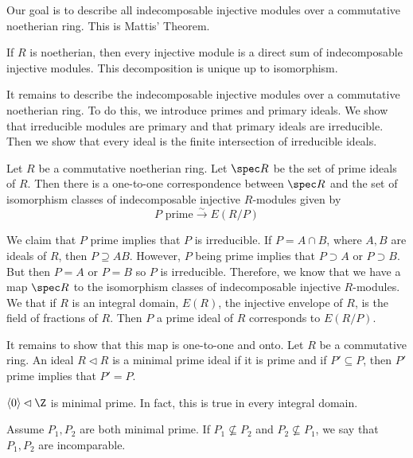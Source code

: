 Our goal is to describe all indecomposable injective modules over a commutative noetherian ring. This is Mattis' Theorem.

\begin{thm}
If $R$ is noetherian, then every injective module is a direct sum of indecomposable injective modules. This decomposition is unique up to isomorphism. 
\end{thm}

It remains to describe the indecomposable injective modules over a commutative noetherian ring. To do this, we introduce primes and primary ideals. We show that irreducible modules are primary and that primary ideals are irreducible. Then we show that every ideal is the finite intersection of irreducible ideals.

\begin{thm}
Let $R$ be a commutative noetherian ring. Let $\spec R$ be the set of prime ideals of $R$. Then there is a one-to-one correspondence between $\spec R$ and the set of isomorphism classes of indecomposable injective $R$-modules given by
\[
P \text{ prime} \stackrel{\sim}{\longrightarrow} E(R/P)
\]
\end{thm}

\begin{rem}
We claim that $P$ prime implies that $P$ is irreducible. If $P=A \cap B$, where $A,B$ are ideals of $R$, then $P \supseteq AB$. However, $P$ being prime implies that $P \supset A$ or $P \supset B$. But then $P=A$ or $P=B$ so $P$ is irreducible. Therefore, we know that we have a map $\spec R$ to the isomorphism classes of indecomposable injective $R$-modules. We that if $R$ is an integral domain, $E(R)$, the injective envelope of $R$, is the field of fractions of $R$. Then $P$ a prime ideal of $R$ corresponds to $E(R/P)$.
\end{rem}

It remains to show that this map is one-to-one and onto. Let $R$ be a commutative ring. An ideal $R \lhd R$ is a minimal prime ideal if it is prime and if $P' \subseteq P$, then $P'$ prime implies that $P'=P$.

\begin{ex}
$\langle 0 \rangle \lhd \Z$ is minimal prime. In fact, this is true in every integral domain. 
\end{ex}

\begin{rem}
Assume $P_1,P_2$ are both minimal prime. If $P_1 \not\subseteq P_2$ and $P_2 \not\subseteq P_1$, we say that $P_1,P_2$ are incomparable. 
\end{rem}

